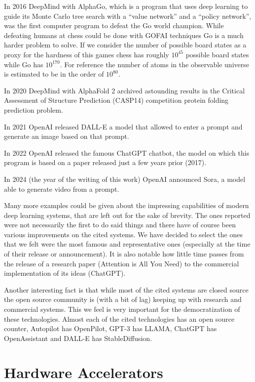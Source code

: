 \documentclass{sapthesis}
\begin{document}
In 2016 DeepMind with AlphaGo, which is a program that uses deep learning to
guide its Monte Carlo tree search with a ``value network'' and a ``policy
network'', was the first computer program to defeat the Go world champion.
While defeating humans at chess could be done with GOFAI techniques Go is a much
harder problem to solve. If we consider the number of possible board
states as a proxy for the
hardness of this games chess has roughly $10^{45}$ possible board states while
Go has $10^{170}$. For reference the number of atoms in the observable universe
is estimated to be in the order of $10^{80}$.

In 2020 DeepMind with AlphaFold 2 archived astounding results in the Critical
Assessment of Structure Prediction (CASP14) competition protein folding
prediction problem.

In 2021 OpenAI released DALL-E a model that allowed to enter a prompt and
generate an image based on that prompt.

In 2022 OpenAI released the famous ChatGPT chatbot, the model on which this
program is based on a paper released just a few years prior (2017).

In 2024 (the year of the writing of this work) OpenAI announced Sora, a model
able to generate video from a prompt.

Many more examples could be given about the impressing capabilities of modern
deep learning systems, that are left out for the sake of brevity. The ones
reported were not necessarily the first to do said things and there have of
course been various improvements on the cited systems. We have decided to select
the ones that we felt were the most famous and representative ones (especially
at the time of their release or announcement). It is also notable how little
time passes from the release of a research paper (Attention is All You Need) to
the commercial implementation of its ideas (ChatGPT).

Another interesting fact is that while most of the cited systems are closed
source the open source community is (with a bit of lag) keeping up with
research and commercial systems. This we feel is very important for the
democratization of these technologies. Almost each of the cited technologies has
an open source counter, Autopilot has OpenPilot, GPT-3 has LLAMA, ChatGPT has
OpenAssistant and DALL-E has StableDiffusion.

\section{Hardware Accelerators}
\end{document}
